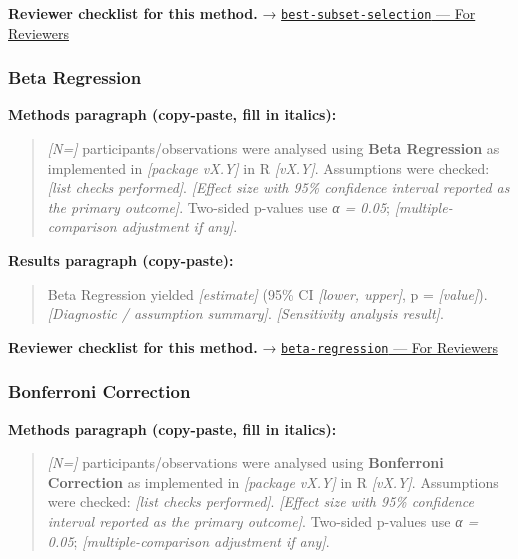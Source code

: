 \documentclass[
]{article}
\begin{document}
\textbf{Reviewer checklist for this method.} →
\href{../chapters/07-regression/best-subset-selection.Rmd\#for-reviewers}{\texttt{best-subset-selection}
--- For Reviewers}

\subsubsection{Beta Regression}\label{beta-regression}

\textbf{Methods paragraph (copy-paste, fill in italics):}

\begin{quote}
\emph{{[}N={]}} participants/observations were analysed using
\textbf{Beta Regression} as implemented in \emph{{[}package vX.Y{]}} in
R \emph{{[}vX.Y{]}}. Assumptions were checked: \emph{{[}list checks
performed{]}}. \emph{{[}Effect size with 95\% confidence interval
reported as the primary outcome{]}}. Two-sided p-values use \emph{α =
0.05}; \emph{{[}multiple-comparison adjustment if any{]}}.
\end{quote}

\textbf{Results paragraph (copy-paste):}

\begin{quote}
Beta Regression yielded \emph{{[}estimate{]}} (95\% CI \emph{{[}lower,
upper{]}}, p = \emph{{[}value{]}}). \emph{{[}Diagnostic / assumption
summary{]}}. \emph{{[}Sensitivity analysis result{]}}.
\end{quote}

\textbf{Reviewer checklist for this method.} →
\href{../chapters/07-regression/beta-regression.Rmd\#for-reviewers}{\texttt{beta-regression}
--- For Reviewers}

\subsubsection{Bonferroni Correction}\label{bonferroni-correction}

\textbf{Methods paragraph (copy-paste, fill in italics):}

\begin{quote}
\emph{{[}N={]}} participants/observations were analysed using
\textbf{Bonferroni Correction} as implemented in \emph{{[}package
vX.Y{]}} in R \emph{{[}vX.Y{]}}. Assumptions were checked: \emph{{[}list
checks performed{]}}. \emph{{[}Effect size with 95\% confidence interval
reported as the primary outcome{]}}. Two-sided p-values use \emph{α =
0.05}; \emph{{[}multiple-comparison adjustment if any{]}}.
\end{quote}
\end{document}

